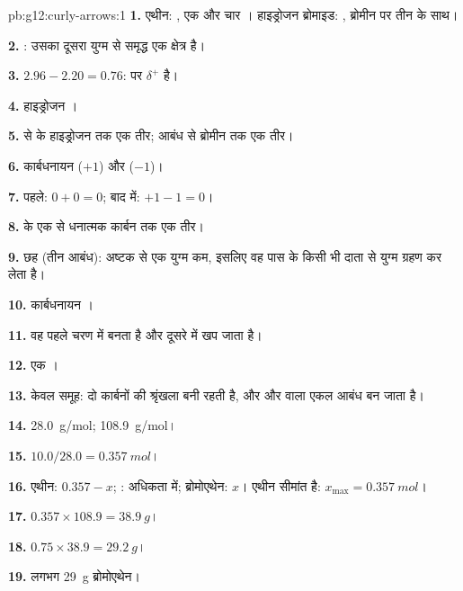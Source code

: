 \begin{solution}{pb:g12:curly-arrows:1}
\textbf{1.} एथीन: , एक  और चार ।
हाइड्रोजन ब्रोमाइड: , ब्रोमीन पर तीन  के साथ।

\textbf{2.} : उसका दूसरा युग्म  से समृद्ध
एक क्षेत्र है।

\textbf{3.} $2.96 - 2.20 = 0.76$:  पर $\delta^+$ है।

\textbf{4.} हाइड्रोजन ।

\textbf{5.}  से  के हाइड्रोजन तक एक तीर;
 आबंध से ब्रोमीन तक एक तीर।

\textbf{6.} कार्बधनायन  ($+1$) और  ($-1$)।

\textbf{7.} पहले: $0 + 0 = 0$; बाद में: $+1 - 1 = 0$।

\textbf{8.}  के एक  से धनात्मक
कार्बन तक एक तीर।

\textbf{9.} छह (तीन आबंध): अष्टक से एक युग्म कम, इसलिए वह पास के किसी भी दाता से
युग्म ग्रहण कर लेता है।

\textbf{10.} कार्बधनायन ।

\textbf{11.} वह पहले चरण में बनता है और दूसरे में खप जाता है।

\textbf{12.} एक ।

\textbf{13.} केवल समूह: दो कार्बनों की श्रृंखला बनी रहती है, और
  और  वाला एकल आबंध बन जाता है।

\textbf{14.} \qty{28.0}{g/mol}; \qty{108.9}{g/mol}।

\textbf{15.} $10.0 / 28.0 = \qty{0.357}{mol}$।

\textbf{16.} एथीन: $0.357 - x$; : अधिकता में; ब्रोमोएथेन: $x$।
एथीन सीमांत है: $x_{\max} = \qty{0.357}{mol}$।

\textbf{17.} $0.357 \times 108.9 = \qty{38.9}{g}$।

\textbf{18.} $0.75 \times 38.9 = \qty{29.2}{g}$।

\textbf{19.} लगभग \qty{29}{g} ब्रोमोएथेन।
\end{solution}
